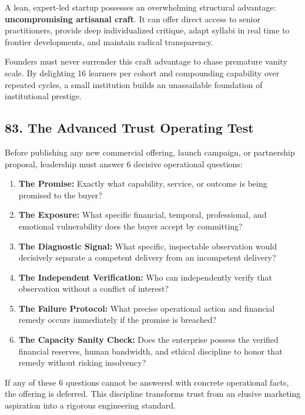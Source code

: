 A lean, expert-led startup possesses an overwhelming structural advantage: \textbf{uncompromising artisanal craft}. It can offer direct access to senior practitioners, provide deep individualized critique, adapt syllabi in real time to frontier developments, and maintain radical transparency. 

Founders must never surrender this craft advantage to chase premature vanity scale. By delighting 16 learners per cohort and compounding capability over repeated cycles, a small institution builds an unassailable foundation of institutional prestige.

\subsection*{83. The Advanced Trust Operating Test}

Before publishing any new commercial offering, launch campaign, or partnership proposal, leadership must answer 6 decisive operational questions:
\begin{enumerate}
\item \textbf{The Promise:} Exactly what capability, service, or outcome is being promised to the buyer?
\item \textbf{The Exposure:} What specific financial, temporal, professional, and emotional vulnerability does the buyer accept by committing?
\item \textbf{The Diagnostic Signal:} What specific, inspectable observation would decisively separate a competent delivery from an incompetent delivery?
\item \textbf{The Independent Verification:} Who can independently verify that observation without a conflict of interest?
\item \textbf{The Failure Protocol:} What precise operational action and financial remedy occurs immediately if the promise is breached?
\item \textbf{The Capacity Sanity Check:} Does the enterprise possess the verified financial reserves, human bandwidth, and ethical discipline to honor that remedy without risking insolvency?
\end{enumerate}

If any of these 6 questions cannot be answered with concrete operational facts, the offering is deferred. This discipline transforms trust from an elusive marketing aspiration into a rigorous engineering standard.

